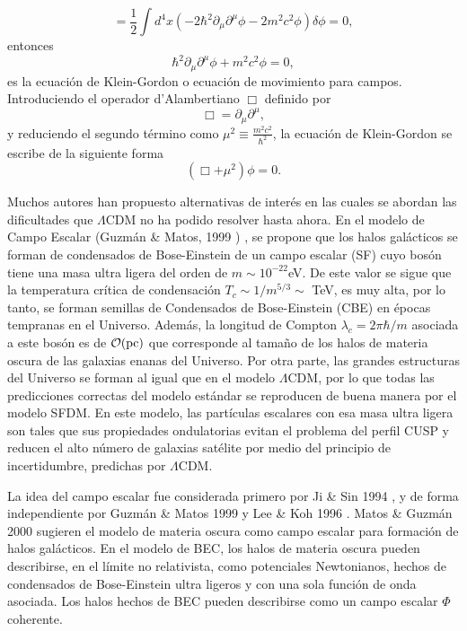 \documentclass[a4paper,openright,12pt]{book}
\begin{document}
\begin{equation}
= \frac{1}{2} \int d^{4}x (-2\hbar^{2}\partial_{\mu}\partial^{\mu}\phi
- 2m^{2}c^{2}\phi)\delta\phi = 0,\label{eqn 1.50}
\end{equation}
entonces
\begin{equation}
\hbar^{2}\partial_{\mu}\partial^{\mu}\phi + m^{2}c^{2}\phi = 0,\label{eqn 1.51}
\end{equation}
es la ecuación de Klein-Gordon o ecuación de movimiento para campos. Introduciendo el operador d'Alambertiano $\Box$ definido por
\begin{equation}
\Box = \partial_{\mu}\partial^{\mu},\label{eqn 1.52}
\end{equation}
y reduciendo el segundo término como $\mu^{2}\equiv\frac{m^{2}c^{2}}{\hbar^{2}}$, la ecuación de Klein-Gordon se escribe de la siguiente forma
\begin{equation}
\left(\Box + \mu^{2}\right)\phi = 0.\label{eqn 1.53}
\end{equation}

Muchos autores han propuesto alternativas de interés en las cuales se abordan las dificultades que $\Lambda$CDM no ha podido resolver hasta ahora. En el modelo de Campo Escalar (Guzmán \& Matos, 1999 \cite{Siddhartha Matos}) , se propone que los halos galácticos se forman de condensados de Bose-Einstein de un campo escalar (SF) cuyo bosón tiene una masa ultra ligera del orden de $m \sim 10^{-22}$eV. De este valor se sigue que la temperatura crítica de condensación $T_{c} \sim 1/m^{5/3} \sim $ TeV, es muy alta, por lo tanto, se forman semillas de Condensados de Bose-Einstein (CBE) en épocas tempranas en el Universo. Además, la longitud de Compton $\lambda_{c} = 2\pi \hbar / m$ asociada a este bosón es de $\mathcal{O}(\textup{pc})$ que corresponde al tamaño de los halos de materia oscura de las galaxias enanas del Universo. Por otra parte, las grandes estructuras del Universo se forman al igual que en el modelo $\Lambda$CDM, por lo que todas las predicciones correctas del modelo estándar se reproducen de buena manera por el modelo SFDM. En este modelo, las partículas escalares con esa masa ultra ligera son tales que sus propiedades ondulatorias evitan el problema del perfil CUSP y reducen el alto número de galaxias satélite por medio del principio de incertidumbre, predichas por $\Lambda$CDM.

La idea del campo escalar fue considerada primero por Ji \& Sin 1994 \cite{1.3.01}, y de forma independiente por Guzmán \& Matos 1999 \cite{Siddhartha Matos} y Lee \& Koh 1996 \cite{1.3.02}. Matos \& Guzmán 2000 \cite{1.3.03} sugieren el modelo de materia oscura como campo escalar para formación de halos galácticos. En el modelo de BEC, los halos de materia oscura pueden describirse, en el límite no relativista, como potenciales Newtonianos, hechos de condensados de Bose-Einstein ultra ligeros y con una sola función de onda asociada. Los halos hechos de BEC pueden describirse como un campo escalar $\Phi$ coherente.
\end{document}
